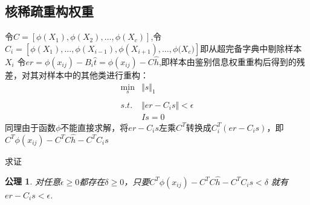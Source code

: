 \subsection{核稀疏重构权重}

令$C=[\phi{(X_{1})},\phi{(X_{2})},\ldots,\phi{(X_{c})}]$,令$C_{i}=[\phi{(X_{1})},\ldots,\phi{(X_{i-1})},\phi{(X_{i+1})},\ldots,\phi{(X_{c}})]$即从超完备字典中剔除样本$X_{i}$
令$er=\phi{(x_{ij})}-B_{i}\hat{t}=\phi{(x_{ij})}-C\hat{h}$,即样本由鉴别信息权重重构后得到的残差，对其对样本中的其他类进行重构：
\begin{displaymath}
	\begin{array}{ll}
		\min_{s} & \Vert{s}\Vert_{1}\\
		\\
		s.t.  & \Vert{er-C_{i}s}\Vert < \epsilon \\
		& Is = 0
	\end{array}
\end{displaymath}
同理由于函数$\phi$不能直接求解，将${er-C_{i}s} $左乘$C^{T}$转换成${C_{i}^{T}(er-C_{i}s)}$，即$C^{T}\phi{(x_{ij})}-C^{T}C\hat{h}-C^{T}C_{i}s$

求证
\newtheorem{confirm}{公理}[section]
	\begin{confirm}
		对任意$\epsilon\ge 0$都存在$\delta\ge 0$，只要$C^{T}\phi{(x_{ij})}-C^{T}C\hat{h}-C^{T}C_{i}s<\delta$
		就有$er-C_{i}s < \epsilon$.
	\end{confirm}

